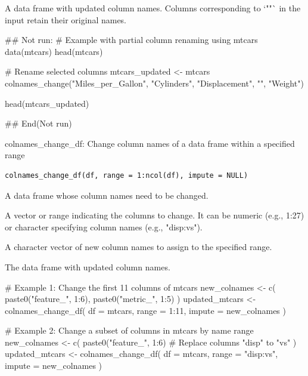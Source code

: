\documentclass[a4paper]{book}
\begin{document}
%
\begin{Value}
A data frame with updated column names. Columns corresponding to `""` in the input retain their original names.
\end{Value}
%
\begin{Examples}
\begin{ExampleCode}
## Not run: 
# Example with partial column renaming using mtcars
data(mtcars)
head(mtcars)

# Rename selected columns
mtcars_updated <- mtcars %
  colnames_change("Miles_per_Gallon", "Cylinders", "Displacement", "", "Weight")

head(mtcars_updated)

## End(Not run)

\end{ExampleCode}
\end{Examples}
%
\begin{Description}
colnames\_change\_df: Change column names of a data frame within a specified range
\end{Description}
%
\begin{Usage}
\begin{verbatim}
colnames_change_df(df, range = 1:ncol(df), impute = NULL)
\end{verbatim}
\end{Usage}
%
\begin{Arguments}
\begin{ldescription}
\item[\code{df}] A data frame whose column names need to be changed.

\item[\code{range}] A vector or range indicating the columns to change. It can be numeric (e.g., 1:27) or character specifying column names (e.g., "disp:vs").

\item[\code{impute}] A character vector of new column names to assign to the specified range.
\end{ldescription}
\end{Arguments}
%
\begin{Value}
The data frame with updated column names.
\end{Value}
%
\begin{Examples}
\begin{ExampleCode}
# Example 1: Change the first 11 columns of mtcars
new_colnames <- c(
  paste0("feature_", 1:6),
  paste0("metric_", 1:5)
)
updated_mtcars <- colnames_change_df(
  df = mtcars,
  range = 1:11,
  impute = new_colnames
)

# Example 2: Change a subset of columns in mtcars by name range
new_colnames <- c(
  paste0("feature_", 1:6)   # Replace columns "disp" to "vs"
)
updated_mtcars <- colnames_change_df(
  df = mtcars,
  range = "disp:vs",
  impute = new_colnames
)

\end{ExampleCode}
\end{Examples}
\end{document}
